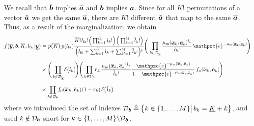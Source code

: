 \documentclass[11pt,a4paper]{article}
\newcommand{\ist}{\hspace*{.3mm}}
\newcommand{\rmv}{\hspace*{-.3mm}}
\newcommand{\cl}[1]{\mathcal{#1}}
\newcommand{\nn}{\nonumber}
\newcommand{\xnew}{\overline{\V{x}}}
\newcommand{\enew}{\overline{\V{e}}}
\newcommand{\rnew}{\overline{r}}
\newcommand{\fd}{f_{\mathrm{d}}}
\begin{document}
We recall that $\tilde{\bm{b}}$ implies $\tilde{\bm{a}}$ and $\bm{b}$ implies $\bm{a}$. Since for all $\overline{K}!$  permutations of a vector $\tilde{\bm{a}}$ we get the same $\overline{\bm{a}}$, there are $\overline{K !}$ different $\tilde{\bm{a}}$ that map to the same $\overline{\bm{a}}$. Thus, as a result of the marginalization, we \vspace{0mm} obtain
\begin{align}
f(\overline{\V{y}}, \V{b}, \overline{K}, l_{\mathrm{fa}} \ist | \ist \underline{\V{y}})   &\hspace{0mm}=  p\big( \overline{K} \big)    \ist\ist p(l_{\mathrm{fa}} )\frac{\overline{K}! \ist l_{\mathrm{fa}}! \ist \Big(\prod^{\underline{K}}_{k=1} l_{k} ! \Big) \ist \Big(\prod^{M}_{k=1} \overline{l}_{k} ! \Big)}{\Big( l_{\mathrm{fa}}  + \sum^{\underline{K}}_{k=1}  l_{k}  +  \sum^{M}_{k'=1} \ist \overline{l}_{k'}  \Big)!}  \Bigg ( \ist \prod_{k \in \cl{D}_{\underline{\V{y}}}} \frac{\mu_{\mathrm{m}} (\underline{\V{x}}_k,\underline{\V{e}}_k)^{l_k}}{l_{k}!} \ist \mathpzc{e}^{-\mu_{\mathrm{m}}(\underline{\V{x}}_k,\underline{\V{e}}_k)}  \rmv  \Bigg) \nn\\[2mm]
&\hspace{0mm\times }\Bigg( \prod_{k \notin \cl{D}_{\underline{\V{y}}}}  \rmv \delta \big(l_{k}\big) \rmv \rmv   \Bigg) \rmv \Bigg(  \prod_{k \in \Set{D}_{\V{b}}} \rmv\rmv \rnew_k \ist\ist \frac{\mu_{\mathrm{m}}(\overline{\V{x}}_k,\overline{\V{e}}_k)^{ \overline{l}_{k}  }}{ \overline{l}_{k}  !} \frac{\mathpzc{e}^{-\mu_{\mathrm{m}}(\overline{\V{x}}_k,\overline{\V{e}}_k)}}{1-\mathpzc{e}^{-\mu_{\mathrm{m}(\overline{\V{x}}_k,\overline{\V{e}}_k)}}} \ist\ist f_{\mathrm{n}}(\overline{\V{x}}_k, \overline{\V{e}}_k) \rmv \Bigg) \nn\\[2mm]
&\hspace{0mm}\times  \prod_{k \notin \Set{D}_{\V{b}}}  \rmv\rmv\rmv \fd(\xnew_k,\enew_k) \ist (1-\rnew_k) \hspace{.5mm} \delta\big(\ist \overline{l}_k \big) \rmv \nn
\end{align}
where we introduced the set of indexes $\Set{D}_{\V{b}} \triangleq \big\{ k \in \{1,\dots, M\} \ist \big| \ist b_k = \underline{K} + k\big\}$, and used $k \notin\Set{D}_{\V{b}}$ short for $ k \in \{1,\dots,M\} \backslash \Set{D}_{\V{b}}$. 
\end{document}
